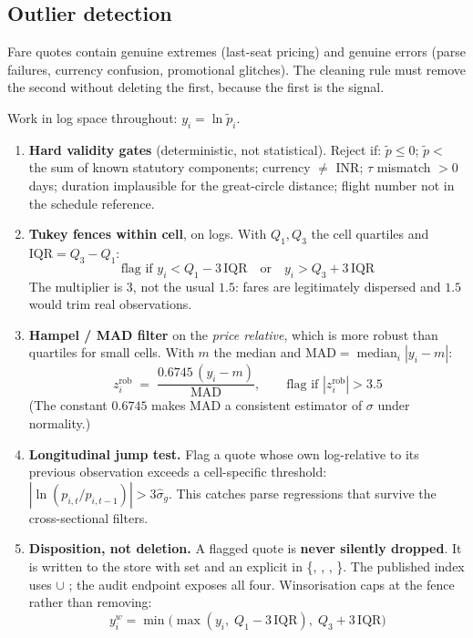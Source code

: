 \subsection{Outlier detection}

Fare quotes contain genuine extremes (last-seat pricing) and genuine errors (parse
failures, currency confusion, promotional glitches). The cleaning rule must remove the
second without deleting the first, because the first is the signal.

Work in log space throughout: $y_i = \ln \tilde p_i$.

\begin{enumerate}
\item \textbf{Hard validity gates} (deterministic, not statistical). Reject if:
$\tilde p \le 0$; $\tilde p <$ the sum of known statutory components; currency $\neq$ INR;
$\tau$ mismatch $>0$ days; duration implausible for the great-circle distance; flight number
not in the schedule reference.

\item \textbf{Tukey fences within cell}, on logs. With $Q_1, Q_3$ the cell quartiles and
$\text{IQR}=Q_3-Q_1$:
\begin{equation}
\text{flag if } y_i < Q_1 - 3\,\text{IQR} \quad\text{or}\quad y_i > Q_3 + 3\,\text{IQR}
\end{equation}
The multiplier is $3$, not the usual $1.5$: fares are legitimately dispersed and $1.5$
would trim real observations.

\item \textbf{Hampel / MAD filter} on the \emph{price relative}, which is more robust than
quartiles for small cells. With $m$ the median and
$\text{MAD} = \operatorname{median}_i |y_i - m|$:
\begin{equation}
z_i^{\text{rob}} \;=\; \frac{0.6745\,(y_i - m)}{\text{MAD}},
\qquad \text{flag if } |z_i^{\text{rob}}| > 3.5
\end{equation}
(The constant $0.6745$ makes MAD a consistent estimator of $\sigma$ under normality.)

\item \textbf{Longitudinal jump test.} Flag a quote whose own log-relative to its previous
observation exceeds a cell-specific threshold: $|\ln(p_{i,t}/p_{i,t-1})| > 3\hat\sigma_g$.
This catches parse regressions that survive the cross-sectional filters.

\item \textbf{Disposition, not deletion.} A flagged quote is \textbf{never silently
dropped}. It is written to the store with  set and an explicit
 in \{, , ,
\}. The published index uses  $\cup$ ;
the audit endpoint exposes all four. Winsorisation caps at the fence rather than removing:
\begin{equation}
y_i^{w} = \min\big(\max(y_i,\; Q_1 - 3\,\text{IQR}),\; Q_3 + 3\,\text{IQR}\big)
\end{equation}
\end{enumerate}

